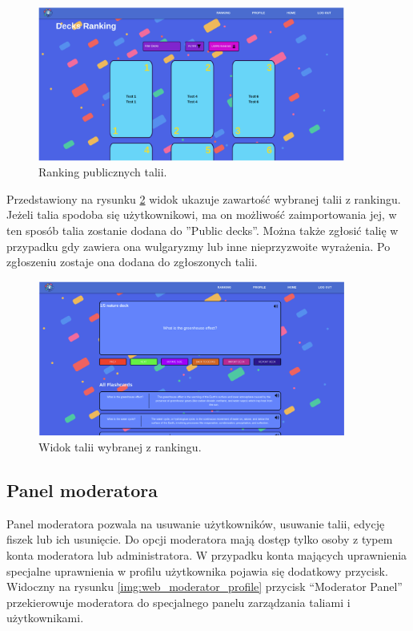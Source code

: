 \begin{figure}[H]
    \centering
    \includegraphics[width=0.9\textwidth]{chapters/chapter_10/images_web/web_decks_ranking}
    \caption{Ranking publicznych talii.}
    \label{img:web_decks_ranking}
\end{figure}


Przedstawiony na rysunku \ref{img:web_public_deck} widok ukazuje zawartość wybranej talii z rankingu. Jeżeli talia spodoba się użytkownikowi, ma on możliwość zaimportowania jej, w ten sposób talia zostanie dodana do ”Public decks”. Można także zgłosić talię w przypadku gdy zawiera ona wulgaryzmy lub inne nieprzyzwoite wyrażenia. Po zgłoszeniu zostaje ona dodana do zgłoszonych talii.

\begin{figure}[H]
    \centering
    \includegraphics[width=0.9\textwidth]{chapters/chapter_10/images_web/web_public_deck}
    \caption{Widok talii wybranej z rankingu.}
    \label{img:web_public_deck}
\end{figure}

\subsection{Panel moderatora}
Panel moderatora pozwala na usuwanie użytkowników, usuwanie talii, edycję fiszek lub ich usunięcie. Do opcji moderatora mają dostęp tylko osoby z typem konta moderatora lub administratora. W przypadku konta mających uprawnienia specjalne uprawnienia w profilu użytkownika pojawia się dodatkowy przycisk. Widoczny na rysunku  \ref{img:web_moderator_profile} przycisk “Moderator Panel” przekierowuje moderatora do specjalnego panelu zarządzania taliami i użytkownikami.


